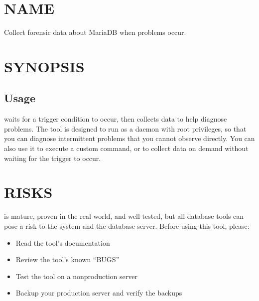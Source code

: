 \documentclass[letterpaper,10pt,english]{sphinxmanual}
\begin{document}
\section{NAME}
\label{\detokenize{mariadb-stat:name}}
\sphinxAtStartPar
{} \sphinxhyphen{} Collect forensic data about MariaDB when problems occur.


\section{SYNOPSIS}
\label{\detokenize{mariadb-stat:synopsis}}

\subsection{Usage}
\label{\detokenize{mariadb-stat:usage}}
\begin{sphinxVerbatim}[commandchars=\\\{\}]
 \PYG{p}{[}\PYG{p}{]}
\end{sphinxVerbatim}

\sphinxAtStartPar
{} waits for a trigger condition to occur, then collects data
to help diagnose problems.  The tool is designed to run as a daemon with root
privileges, so that you can diagnose intermittent problems that you cannot
observe directly.  You can also use it to execute a custom command, or to
collect data on demand without waiting for the trigger to occur.


\section{RISKS}
\label{\detokenize{mariadb-stat:risks}}
\sphinxAtStartPar
{} is mature, proven in the real world, and well tested,
but all database tools can pose a risk to the system and the database
server.  Before using this tool, please:
\begin{itemize}
\item {} 
\sphinxAtStartPar
Read the tool’s documentation

\item {} 
\sphinxAtStartPar
Review the tool’s known “BUGS”

\item {} 
\sphinxAtStartPar
Test the tool on a non\sphinxhyphen{}production server

\item {} 
\sphinxAtStartPar
Backup your production server and verify the backups

\end{itemize}
\end{document}
